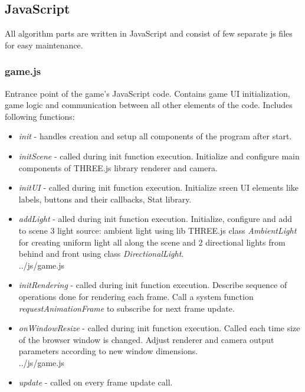 \documentclass[12pt]{article}
\begin{document}
\subsection{JavaScript}
All algorithm parts are written in JavaScript and consist of few separate js files for easy maintenance.
\subsubsection{game.js}
Entrance point of the game's JavaScript code. Contains game UI initialization, game logic and communication between all other elements of the code.
Includes following functions:
\begin{itemize}
\item \textit{init} - handles creation and setup all components of the program after start.
\item \textit{initScene} - called during init function execution. Initialize and configure main components of THREE.js library renderer and camera.
\item \textit{initUI} - called during init function execution. Initialize sreen UI elements like labels, buttons and their callbacks, Stat library.
\item \textit{addLight} - alled during init function execution. Initialize, configure and add to scene 3 light source: ambient light using lib THREE.js class \textit{AmbientLight} for creating uniform light all along the scene and 2 directional lights from behind and front using class \textit{DirectionalLight}.
\\

{../js/game.js}

\item \textit{initRendering} - called during init function execution. Describe sequence of operations done for rendering each frame. Call a system function \textit{requestAnimationFrame} to subscribe for next frame update.
\item \textit{onWindowResize} - called during init function execution. Called each time size of the browser window is changed. Adjust renderer and camera output parameters according to new window dimensions.
\\

{../js/game.js}

\item \textit{update} - called on every frame update call. 
\end{itemize}
\end{document}
